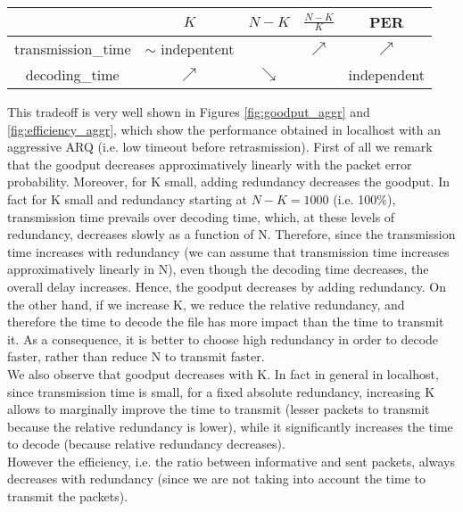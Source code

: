 \begin{center}
\begin{tabular}{ccccc}

\toprule
&$K$&$N-K$&$\frac{N-K}{K}$&PER\\
\midrule
transmission\_time&$\sim$ indepentent& & $\nearrow$&$\nearrow$\\
decoding\_time&$\nearrow$&$\searrow$&&independent\\
\bottomrule
\end{tabular}
\end{center}


This tradeoff is very well shown in Figures \ref{fig:goodput_aggr} and \ref{fig:efficiency_aggr}, which show the performance obtained in localhost with an aggressive ARQ (i.e. low timeout before retrasmission). First of all we remark that the goodput decreases approximatively linearly with the packet error probability. Moreover, for K small, adding redundancy decreases the goodput. In fact for K small and redundancy starting at $N-K=1000$ (i.e. 100\%), transmission time prevails over decoding time, which, at these levels of redundancy, decreases slowly as a function of N. Therefore, since the transmission time increases with redundancy (we can assume that transmission time increases approximatively linearly in N), even though the decoding time decreases, the overall delay increases. Hence, the goodput decreases by adding redundancy.
On the other hand, if we increase K, we reduce the relative redundancy, and therefore the time to decode the file has more impact than the time to transmit it. As a consequence, it is better to choose high redundancy in order to decode faster, rather than reduce N to transmit faster.\\
We also observe that goodput decreases with K. In fact in general in localhost, since transmission time is small, for a fixed absolute redundancy, increasing K allows to marginally improve the time to transmit (lesser packets to transmit because the relative redundancy is lower), while it significantly increases the time to decode (because relative redundancy decreases). \\
However the efficiency, i.e. the ratio between informative and sent packets, always decreases with redundancy (since we are not taking into account the time to transmit the packets).\\


